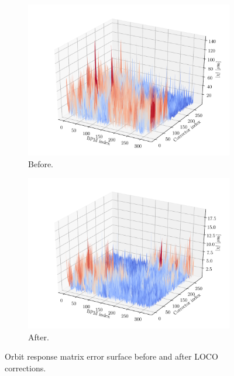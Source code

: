 \begin{figure}
\centering
\begin{subfigure}[t]{0.49\textwidth}
\includegraphics[width=1.0\textwidth]{figures/surface_before_loco.pdf}
    \caption{Before.}
    \label{subfig:ondiag}
\end{subfigure}
 \begin{subfigure}[t]{0.49\textwidth}
\includegraphics[width=1.0\textwidth]{figures/surface_after_loco.pdf}
    \caption{After.}
    \label{subfig:offdiag}
\end{subfigure}
\caption{Orbit response matrix error surface before and after LOCO corrections.}
\label{fig:hist}
\end{figure}


